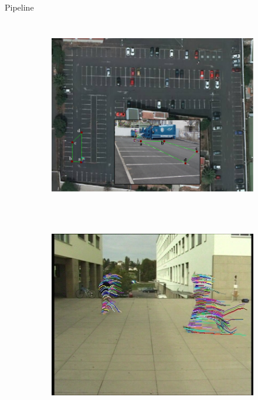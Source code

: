 \begin{frame}[plain]{Pipeline}
\begin{columns}[c]
\begin{figure}[t]
\begin{subfigure}[b]{0.3\columnwidth}
	    \includegraphics[width=\textwidth]{localization}
	\end{subfigure}%
	\\~\\
	\begin{subfigure}[b]{0.5\columnwidth}
	    \includegraphics[width=\textwidth]{fig6}
	\end{subfigure}%
    \end{figure}
  \end{columns}

  

\end{frame}
